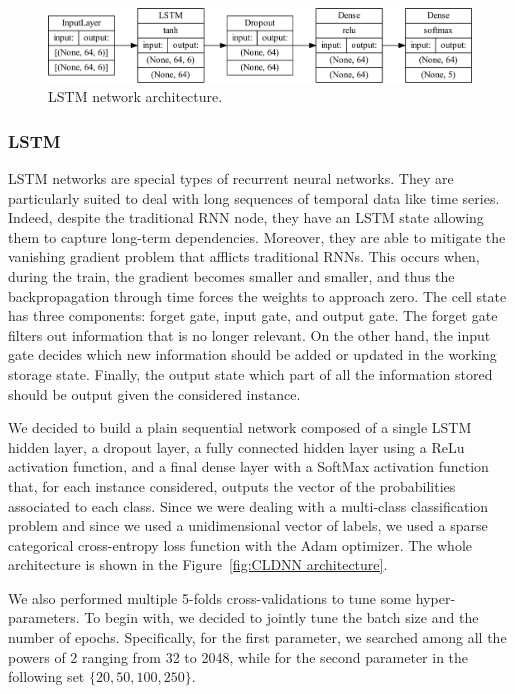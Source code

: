 \documentclass[10pt, a4paper, twocolumn]{article}
\begin{document}
\begin{figure}
    \centering
    \includegraphics[width=\columnwidth]{immagini simone/lstm_clf.pdf}
    \caption{LSTM network architecture.}
    \label{fig:lstm_architecture}
\end{figure}

\subsubsection*{LSTM}

LSTM networks are special types of recurrent neural networks. They are particularly suited to deal with long sequences of temporal data like time series. Indeed, despite the traditional RNN node, they have an LSTM state allowing them to capture long-term dependencies.  Moreover, they are able to mitigate the vanishing gradient problem that afflicts traditional RNNs. This occurs when, during the train, the gradient becomes smaller and smaller, and thus the backpropagation through time forces the weights to approach zero. The cell state has three components: forget gate, input gate, and output gate. The forget gate filters out information that is no longer relevant. On the other hand, the input gate decides which new information should be added or updated in the working storage state. Finally, the output state which part of all the information stored should be output given the considered instance.

We decided to build a plain sequential network composed of a single LSTM hidden layer, a dropout layer, a fully connected hidden layer using a ReLu activation function, and a final dense layer with a SoftMax activation function that, for each instance considered, outputs the vector of the probabilities associated to each class. Since we were dealing with a multi-class classification problem and since we used a unidimensional vector of labels, we used a sparse categorical cross-entropy loss function with the Adam optimizer. The whole architecture is shown in the Figure~\ref{fig:CLDNN architecture}.

We also performed multiple 5-folds cross-validations to tune some hyper-parameters. To begin with, we decided to jointly tune the batch size and the number of epochs. Specifically, for the first parameter, we searched among all the powers of 2 ranging from 32 to 2048, while for the second parameter in the following set $\{20, 50, 100, 250\}$.
\end{document}
